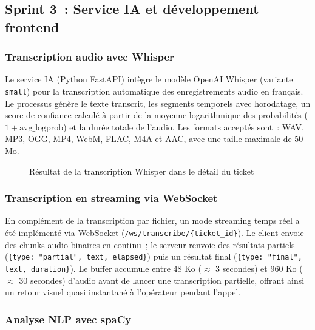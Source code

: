 \subsection{Sprint 3~: Service IA et d\'{e}veloppement frontend}

\subsubsection{Transcription audio avec Whisper}

Le service IA (Python FastAPI) int\`{e}gre le mod\`{e}le OpenAI Whisper (variante \texttt{small}) pour la transcription automatique des enregistrements audio en fran\c{c}ais. Le processus g\'{e}n\`{e}re le texte transcrit, les segments temporels avec horodatage, un score de confiance calcul\'{e} \`{a} partir de la moyenne logarithmique des probabilit\'{e}s ($1 + \text{avg\_logprob}$) et la dur\'{e}e totale de l'audio. Les formats accept\'{e}s sont~: WAV, MP3, OGG, MP4, WebM, FLAC, M4A et AAC, avec une taille maximale de 50 Mo.

\begin{figure}[H]
    \centering
    \caption{R\'{e}sultat de la transcription Whisper dans le d\'{e}tail du ticket}
    \label{fig:transcription}
\end{figure}

\subsubsection{Transcription en streaming via WebSocket}

En compl\'{e}ment de la transcription par fichier, un mode streaming temps r\'{e}el a \'{e}t\'{e} impl\'{e}ment\'{e} via WebSocket (\texttt{/ws/transcribe/\{ticket\_id\}}). Le client envoie des chunks audio binaires en continu~; le serveur renvoie des r\'{e}sultats partiels (\texttt{\{type: "partial", text, elapsed\}}) puis un r\'{e}sultat final (\texttt{\{type: "final", text, duration\}}). Le buffer accumule entre 48 Ko ($\approx$ 3 secondes) et 960 Ko ($\approx$ 30 secondes) d'audio avant de lancer une transcription partielle, offrant ainsi un retour visuel quasi instantan\'{e} \`{a} l'op\'{e}rateur pendant l'appel.

\subsubsection{Analyse NLP avec spaCy}

